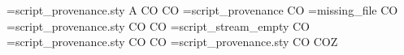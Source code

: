 =script_provenance.sty\relax
A C\else O\fi
{}\relax{} C\else O\fi
{}=script_provenance\relax{} C\else O\fi
{}=missing_file\relax{} C\else O\fi
{}=script_provenance.sty\relax{} C\else O\fi
{}\relax{} C\else O\fi
{}=script_stream_empty\relax{} C\else O\fi
{=script_provenance.sty\relax} C\else O\fi
{}\relax{} C\else O\fi
{}=script_provenance.sty\relax{} C\else O\fi
{} C\else O\fi Z